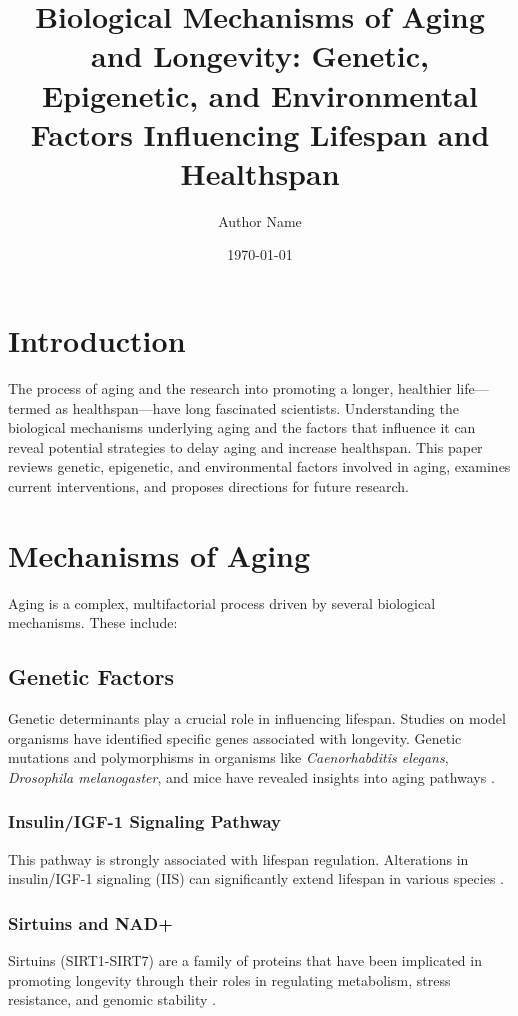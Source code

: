 \documentclass[a4paper,12pt]{article}
\title{Biological Mechanisms of Aging and Longevity: Genetic, Epigenetic, and Environmental Factors Influencing Lifespan and Healthspan}
\author{Author Name}
\date{\today}
\begin{document}
\maketitle
\tableofcontents

\section{Introduction}
The process of aging and the research into promoting a longer, healthier life—termed as healthspan—have long fascinated scientists. Understanding the biological mechanisms underlying aging and the factors that influence it can reveal potential strategies to delay aging and increase healthspan. This paper reviews genetic, epigenetic, and environmental factors involved in aging, examines current interventions, and proposes directions for future research.

\section{Mechanisms of Aging}
Aging is a complex, multifactorial process driven by several biological mechanisms. These include:

\subsection{Genetic Factors}
Genetic determinants play a crucial role in influencing lifespan. Studies on model organisms have identified specific genes associated with longevity. Genetic mutations and polymorphisms in organisms like \textit{Caenorhabditis elegans}, \textit{Drosophila melanogaster}, and mice have revealed insights into aging pathways \cite{kenyon2010genetics}.

\subsubsection{Insulin/IGF-1 Signaling Pathway}
This pathway is strongly associated with lifespan regulation. Alterations in insulin/IGF-1 signaling (IIS) can significantly extend lifespan in various species \cite{blagosklonny2019nichol}.

\subsubsection{Sirtuins and NAD+}
Sirtuins (SIRT1-SIRT7) are a family of proteins that have been implicated in promoting longevity through their roles in regulating metabolism, stress resistance, and genomic stability \cite{haigis2006sirtuins,iseda2019sirtuins}.
\end{document}
